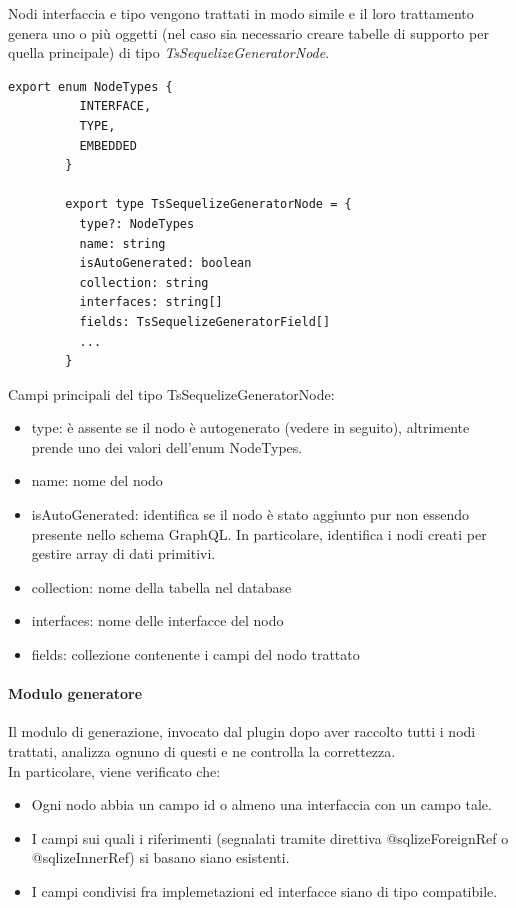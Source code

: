 \documentclass[a4paper, 12pt]{report}
\begin{document}
      Nodi interfaccia e tipo vengono trattati in modo simile e il loro trattamento genera uno o più oggetti (nel caso sia necessario creare tabelle di supporto per quella principale) di tipo \emph{TsSequelizeGeneratorNode}.
      \begin{Verbatim}[samepage=true]
        export enum NodeTypes {
          INTERFACE,
          TYPE,
          EMBEDDED
        }

        export type TsSequelizeGeneratorNode = {
          type?: NodeTypes
          name: string
          isAutoGenerated: boolean
          collection: string
          interfaces: string[]
          fields: TsSequelizeGeneratorField[]
          ...
        }       
      \end{Verbatim}
      Campi principali del tipo TsSequelizeGeneratorNode:
      \begin{itemize}
        \item type: è assente se il nodo è autogenerato (vedere in seguito), altrimente prende uno dei valori dell'enum NodeTypes.
        \item name: nome del nodo
        \item isAutoGenerated: identifica se il nodo è stato aggiunto pur non essendo presente nello schema GraphQL. In particolare, identifica i nodi creati per gestire array di dati primitivi.
        \item collection: nome della tabella nel database
        \item interfaces: nome delle interfacce del nodo
        \item fields: collezione contenente i campi del nodo trattato
      \end{itemize}
      \newpage

      \paragraph*{Modulo generatore}
      Il modulo di generazione, invocato dal plugin dopo aver raccolto tutti i nodi trattati, analizza ognuno di questi e ne controlla la correttezza.\\
      In particolare, viene verificato che:
      \begin{itemize}
        \item Ogni nodo abbia un campo id o almeno una interfaccia con un campo tale.
        \item I campi sui quali i riferimenti (segnalati tramite direttiva @sqlizeForeignRef o @sqlizeInnerRef) si basano siano esistenti.
        \item I campi condivisi fra implemetazioni ed interfacce siano di tipo compatibile.
      \end{itemize}
\end{document}
